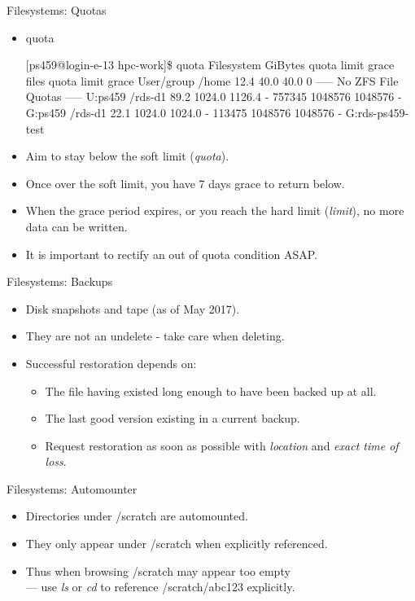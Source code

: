 \begin{frame}[fragile]{Filesystems: Quotas}
\begin{itemize}
\item{quota}
\begin{semiverbatim}
\tiny
[ps459@login-e-13 hpc-work]\$ quota
Filesystem  GiBytes    quota   limit   grace    files    quota    limit   grace User/group
/home          12.4     40.0    40.0       0    ----- No ZFS File Quotas  ----- U:ps459
/rds-d1        89.2   1024.0  1126.4       -   757345  1048576  1048576       - G:ps459
/rds-d1        22.1   1024.0  1024.0       -   113475  1048576  1048576       - G:rds-ps459-test
\end{semiverbatim}
\item<1-|handout:1->{\alert{Aim to stay below the soft limit (\emph{quota}).}}
\item<2-|handout:1->{\alert{Once over the soft limit, you have 7 days grace to return below.}}
\item<3-|handout:2>{\alert{When the grace period expires, or you reach the hard limit (\emph{limit}), no more data can be written.}}
\item<4-|handout:2>{\alert{It is important to rectify an out of quota condition ASAP.}}
\end{itemize}
\end{frame}

\begin{frame}{Filesystems: Backups}
\begin{itemize}
\item<1->{Disk snapshots and tape (as of May 2017).}
\item<2->{{\color{red}They are not an undelete - take care when deleting.}}
\item<3->{Successful restoration depends on:}
\begin{itemize}
\item{The file having existed long enough to have been backed up at all.}
\item{The last good version existing in a current backup.}
\item<4->{\color{red}Request restoration as soon as possible with \emph{location} and \emph{exact time of loss}.}
\medskip
{}
\end{itemize}
\end{itemize}
\end{frame}

\begin{frame}{Filesystems: Automounter}
\begin{itemize}
\item{Directories under /scratch are \alert{automounted}.}
\item{They only appear under /scratch when explicitly referenced.}
\item{Thus when browsing /scratch may appear too empty\hfill\\
\qquad\alert{--- use \emph{ls} or \emph{cd} to reference /scratch/abc123 explicitly.}}
\end{itemize}
\end{frame}


